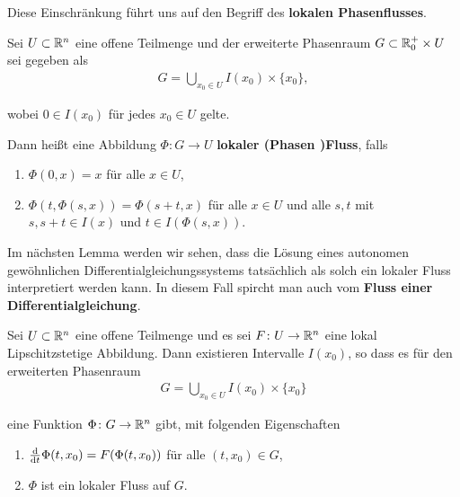 \par
Diese Einschränkung führt uns auf den Begriff des \textbf{lokalen Phasenflusses}.
\label{ode/fluesse:def:LokFluss}
\begin{definition}{}{}



\par
Sei \(U \subset \mathbb{R}^n\) eine offene Teilmenge und der erweiterte Phasenraum \(G\subset \mathbb{R}^+_0\times U\) sei gegeben als
\begin{align*}
G = \bigcup_{x_0\in U} I(x_0) \times \{x_0\},
\end{align*}
\par
wobei \(0\in I(x_0)\) für jedes \(x_0\in U\) gelte.

\par
Dann heißt eine Abbildung \(\Phi: G\rightarrow U\) \textbf{lokaler (Phasen )Fluss}, falls
\begin{enumerate}

\item {} 
\par
\(\Phi(0,x) = x\) für alle \(x\in U\),

\item {} 
\par
\(\Phi(t, \Phi(s, x)) = \Phi(s+t, x)\) für alle \(x\in U\) und alle \(s,t\) mit \(s, s+t\in I(x)\) und \(t\in I(\Phi(s,x))\).

\end{enumerate}
\end{definition}

\par
Im nächsten Lemma werden wir sehen, dass die Lösung eines autonomen gewöhnlichen Differentialgleichungssystems tatsächlich als solch ein lokaler Fluss interpretiert werden kann.
In diesem Fall spircht man auch vom \textbf{Fluss einer Differentialgleichung}.
\label{ode/fluesse:lemma-3}
\begin{lemma}{}{}



\par
Sei \(U\subset\mathbb{R}^n\) eine offene Teilmenge und es sei \(F \colon U \rightarrow \mathbb{R}^n\) eine lokal Lipschitzstetige Abbildung.
Dann existieren Intervalle \(I(x_0)\), so dass es für den erweiterten Phasenraum
\begin{align*}
G = \bigcup_{x_0\in U} I(x_0)\times\{x_0\}
\end{align*}
\par
eine Funktion \(\Phi \colon G\rightarrow \mathbb{R}^n\) gibt, mit folgenden Eigenschaften
\begin{enumerate}

\item {} 
\par
\(\frac{\mathrm{d}}{\mathrm{d} t} \Phi(t, x_0) = F(\Phi(t, x_0))\) für alle \((t,x_0)\in G\),

\item {} 
\par
\(\Phi\) ist ein lokaler Fluss auf \(G\).

\end{enumerate}
\end{lemma}


